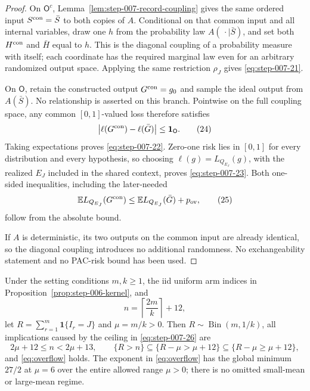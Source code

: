 \begin{proof}

On \(\mathsf O^c\), Lemma~\ref{lem:step-007-record-coupling} gives the
same ordered input \(S^{\rm con}=\bar S\) to both copies of \(A\).
Conditional on that common input and all internal variables, draw one
\(h\) from the probability law \(A(\,\cdot\mid\bar S)\), and set both
\(H^{\rm con}\) and \(\bar H\) equal to \(h\).  This is the diagonal
coupling of a probability measure with itself; each coordinate has
the required marginal law even for an arbitrary randomized output
space.  Applying the same restriction \(\rho_J\) gives \eqref{eq:step-007-21}.

On \(\mathsf O\), retain the constructed output
\(G^{\rm con}=g_0\) and sample the ideal output from \(A(\bar S)\).
No relationship is asserted on this branch.  Pointwise on the full
coupling space, any common \([0,1]\)-valued loss therefore satisfies
\[
\bigl|\ell(G^{\rm con})-\ell(\bar G)\bigr|
\le\mathbf1_{\mathsf O}.
\tag{24}\label{eq:step-007-24}
\]
Taking expectations proves \eqref{eq:step-007-22}.  Zero-one risk lies in \([0,1]\)
for every distribution and every hypothesis, so choosing
\(\ell(g)=L_{Q_{E_J}}(g)\), with the realized \(E_J\) included in the
shared context, proves \eqref{eq:step-007-23}.  Both one-sided inequalities, including
the later-needed
\[
\mathbb E L_{Q_{E_J}}(G^{\rm con})
\le
\mathbb E L_{Q_{E_J}}(\bar G)+p_{\rm ov},
\tag{25}\label{eq:step-007-25}
\]
follow from the absolute bound.

If \(A\) is deterministic, its two outputs on the common input are
already identical, so the diagonal coupling introduces no additional
randomness.  No exchangeability statement and no PAC-risk bound has
been used.

\end{proof}


\begin{lemma}
\label{lem:step-007-overflow}

Under the setting conditions \(m,k\ge1\), the iid uniform
arm indices in Proposition~\ref{prop:step-006-kernel}, and
\[
n=\left\lceil\frac{2m}{k}\right\rceil+12,
\tag{26}\label{eq:step-007-26}
\]
let \(R=\sum_{r=1}^m\mathbf1\{I_r=J\}\) and \(\mu=m/k>0\).
Then \(R\sim\operatorname{Bin}(m,1/k)\), all implications caused by
the ceiling in \eqref{eq:step-007-26} are
\[
2\mu+12\le n<2\mu+13,
\qquad
\{R>n\}\subseteq\{R-\mu>\mu+12\}
\subseteq\{R-\mu\ge\mu+12\},
\tag{27}\label{eq:step-007-27}
\]
and \eqref{eq:overflow} holds.  The exponent in \eqref{eq:overflow} has the global minimum
\(27/2\) at \(\mu=6\) over the entire allowed range \(\mu>0\);
there is no omitted small-mean or large-mean regime.

\end{lemma}

